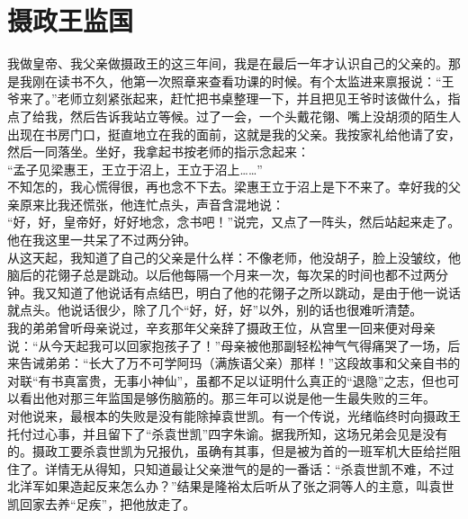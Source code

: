 \fancyhead[RO]{} %
\fancyhead[LE]{} %
\chapter*{摄政王监国}
\thispagestyle{empty}
我做皇帝、我父亲做摄政王的这三年间，我是在最后一年才认识自己的父亲的。那是我刚在读书不久，他第一次照章来查看功课的时候。有个太监进来禀报说：“王爷来了。”老师立刻紧张起来，赶忙把书桌整理一下，并且把见王爷时该做什么，指点了给我，然后告诉我站立等候。过了一会，一个头戴花翎、嘴上没胡须的陌生人出现在书房门口，挺直地立在我的面前，这就是我的父亲。我按家礼给他请了安，然后一同落坐。坐好，我拿起书按老师的指示念起来：\\

“孟子见梁惠王，王立于沼上，王立于沼上……”\\

不知怎的，我心慌得很，再也念不下去。梁惠王立于沼上是下不来了。幸好我的父亲原来比我还慌张，他连忙点头，声音含混地说：\\

“好，好，皇帝好，好好地念，念书吧！”说完，又点了一阵头，然后站起来走了。他在我这里一共呆了不过两分钟。\\

从这天起，我知道了自己的父亲是什么样：不像老师，他没胡子，脸上没皱纹，他脑后的花翎子总是跳动。以后他每隔一个月来一次，每次呆的时间也都不过两分钟。我又知道了他说话有点结巴，明白了他的花翎子之所以跳动，是由于他一说话就点头。他说话很少，除了几个“好，好，好”以外，别的话也很难听清楚。\\

我的弟弟曾听母亲说过，辛亥那年父亲辞了摄政王位，从宫里一回来便对母亲说：“从今天起我可以回家抱孩子了！”母亲被他那副轻松神气气得痛哭了一场，后来告诫弟弟：“长大了万不可学阿玛（满族语父亲）那样！”这段故事和父亲自书的对联“有书真富贵，无事小神仙”，虽都不足以证明什么真正的“退隐”之志，但也可以看出他对那三年监国是够伤脑筋的。那三年可以说是他一生最失败的三年。\\

对他说来，最根本的失败是没有能除掉袁世凯。有一个传说，光绪临终时向摄政王托付过心事，并且留下了“杀袁世凯”四字朱谕。据我所知，这场兄弟会见是没有的。摄政工要杀袁世凯为兄报仇，虽确有其事，但是被为首的一班军机大臣给拦阻住了。详情无从得知，只知道最让父亲泄气的是的一番话：“杀袁世凯不难，不过北洋军如果造起反来怎么办？”结果是隆裕太后听从了张之洞等人的主意，叫袁世凯回家去养“足疾”，把他放走了。\\


